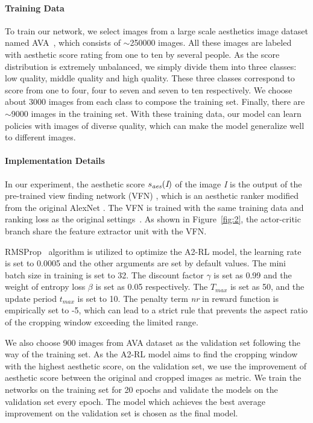 \documentclass[10pt,twocolumn,letterpaper]{article}
\begin{document}
\paragraph{Training Data}
To train our network, we select images from a large scale aesthetics image dataset named AVA~\cite{murray2012ava}, which consists of $\sim$250000 images. All these images are labeled with aesthetic score rating from one to ten by several people. As the score distribution is extremely unbalanced, we simply divide them into three classes: low quality, middle quality and high quality. These three classes correspond to score from one to four, four to seven and seven to ten respectively. We choose about 3000 images from each class to compose the training set. Finally, there are $\sim$9000 images in the training set. With these training data, our model can learn policies with images of diverse quality, which can make the model generalize well to different images.
\paragraph{Implementation Details}
In our experiment, the aesthetic score $s_{\text{\emph{aes}}}(\emph{I})$ of the image \emph{I} is the output of the pre-trained view finding network (VFN) \cite{chen-acmmm-2017}, which is an aesthetic ranker modified from the original AlexNet \cite{krizhevsky2012imagenet}. The VFN is trained with the same training data and ranking loss as the original settings~\cite{chen-acmmm-2017}. As shown in Figure~\ref{fig:2}, the actor-critic branch share the feature extractor unit with the VFN.

RMSProp~\cite{tieleman2012lecture} algorithm is utilized to optimize the A2-RL model, the learning rate is set to 0.0005 and the other arguments are set by default values. The mini batch size in training is set to 32. The discount factor $\gamma$ is set as 0.99 and the weight of entropy loss $\beta$ is set as 0.05 respectively. The $T_{max}$ is set as 50, and the update period $t_{max}$ is set to 10. The penalty term \emph{nr} in reward function is empirically set to -5, which can lead to a strict rule that prevents the aspect ratio of the cropping window exceeding the limited range.

We also choose 900 images from AVA dataset as the validation set following the way of the training set. As the A2-RL model aims to find the cropping window with the highest aesthetic score, on the validation set, we use the improvement of aesthetic score between the original and cropped images as metric. We train the networks on the training set for 20 epochs and validate the models on the validation set every epoch. The model which achieves the best average improvement on the validation set is chosen as the final model.
\end{document}
